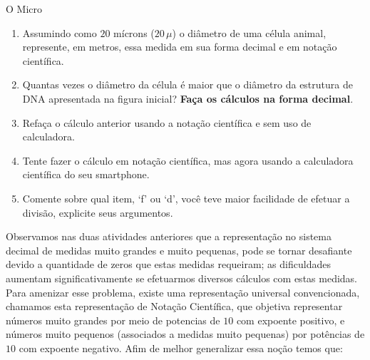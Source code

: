 \begin{task}{O Micro}
\begin{enumerate}
\begin{quote}
\emph{“O diâmetro de uma célula animal mede de {}`10{}` a {}`20{}` mícrons ({}`10{}` a {}`20{}` milionésimos do metro). Elas só são visíveis com microscópios. Essa medida é aproximadamente cinco vezes menor do que a menor partícula visível a olho nu, que teria de 50 a 100 milionésimos do metro. 50 milionésimos do metro é a espessura de meio fio de cabelo \textendash{} de modo aproximado, o limite do que a nossa visão pode alcançar.}” (Fonte: Gestar II - TP4).
\end{quote}

\label{\detokenize{NO103-3:id6}}\label{\detokenize{NO103-3:id14}}

\item {} 
Assumindo como $20$ mícrons ($20\, \mu$) o diâmetro de uma célula animal, represente, em metros, essa medida em sua forma decimal e em notação científica.

\item {} 
Quantas vezes o diâmetro da célula é maior que o diâmetro da estrutura de DNA apresentada na figura inicial? \textbf{Faça os cálculos na forma decimal}.

\item {} 
Refaça o cálculo anterior usando a notação científica e sem uso de calculadora.

\item {} 
Tente fazer o cálculo em notação científica, mas agora usando a calculadora científica do seu smartphone.

\item {} 
Comente sobre qual item, ‘f’ ou ‘d’, você teve maior facilidade de efetuar a divisão, explicite seus argumentos.

\end{enumerate}
\end{task}




\label{\detokenize{NO103-4:organizando-ideias-notacao-cientifica-e-ordem-de-grandeza}}\label{\detokenize{NO103-4::doc}}
Observamos nas duas atividades anteriores que a representação no sistema decimal de medidas muito grandes e muito pequenas, pode se tornar desafiante devido a quantidade de zeros que estas medidas requeiram; as dificuldades aumentam significativamente se efetuarmos diversos cálculos com estas medidas. Para amenizar esse problema, existe uma representação universal convencionada, chamamos esta representação de Notação Científica, que objetiva representar números muito grandes por meio de potencias de $10$ com expoente positivo, e números muito pequenos (associados a medidas muito pequenas) por potências de $10$ com expoente negativo. Afim de melhor generalizar essa noção temos que:

